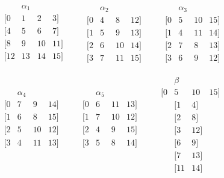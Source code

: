 \documentclass{amsart}
\theoremstyle{plain}
\theoremstyle{definition}
\theoremstyle{definition}
\numberwithin{equation}{section}
\newcommand{\<}{\ensuremath{\langle}}
\renewcommand{\>}{\ensuremath{\rangle}}
\begin{document}
\[
\begin{matrix}
& \alpha_1 &&\\
  [0 & 1 & 2 & 3]\\
  [4 & 5 & 6 & 7]\\
  [8 & 9 & 10 & 11]\\
  [12 & 13 & 14 & 15]\\
\end{matrix}
\qquad
\begin{matrix}
& \alpha_2 &&\\
  [0 &   4 &   8 & 12]\\
  [1 &   5 &   9 & 13]\\
  [2 &   6 & 10 & 14]\\
  [3 &   7 & 11 & 15]
\end{matrix}
\qquad
\begin{matrix}
& \alpha_3 &&\\
  [0 &   5 &  10 & 15]\\
  [1 &   4 &  11 & 14]\\
  [2 &   7 & 8 & 13]\\
  [3 &   6 & 9 & 12]
\end{matrix}
\]

\vskip5mm

\[
\begin{matrix}
& \alpha_4 &&\\
  [0 &   7 & 9 & 14]\\
  [1 &   6 & 8 & 15]\\
  [2 &   5 & 10 & 12]\\
  [3 &   4 & 11 & 13]\\
&&&\\
&&&\\
&&&
\end{matrix}
\qquad
\begin{matrix}
& \alpha_5 &&\\
  [0 &   6 & 11 & 13]\\
  [1 &   7 & 10 & 12]\\
  [2 &   4 & 9 & 15]\\
  [3 &   5 & 8 & 14]\\
&&&\\
&&&\\
&&&
\end{matrix}
\qquad
\begin{matrix}
& \beta &&\\
  [0 &   5 &  10 & 15]\\
&  [1 &   4] & \\
&  [2 & 8] &\\
&  [3 &   12] & \\
& [6 & 9] & \\
&  [7 & 13] &\\
& [11 & 14] & 
\end{matrix}
\]
\end{document}

